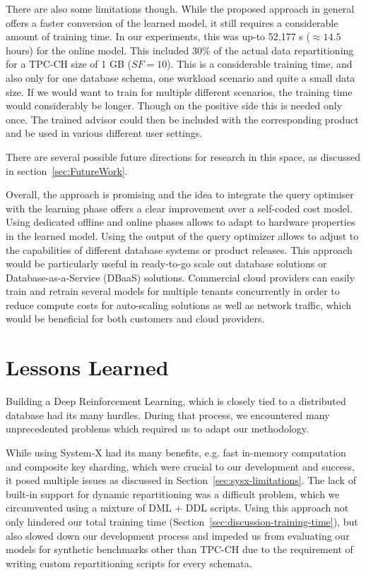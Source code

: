 There are also some limitations though. While the proposed approach in general offers a faster conversion of the learned model, it still requires a considerable amount of training time.
In our experiments, this was up-to 52,177 s ($\approx 14.5$ hours) for the online model. This included 30\% of the actual data repartitioning for a TPC-CH size of 1 GB ($SF = 10$). This is a considerable training time, and also only for one database schema, one workload scenario and quite a small data size. If we would want to train for multiple different scenarios, the training time would considerably be longer. Though on the positive side this is needed only once. The trained advisor could then be included with the corresponding product and be used in various different user settings.

There are several possible future directions for research in this space, as discussed in section~\ref{sec:FutureWork}.

Overall, the approach is promising and the idea to integrate the query optimiser with the learning phase offers a clear improvement over a self-coded cost model. 
Using dedicated offline and online phases allows to adapt to hardware properties in the learned model. Using the output of the query optimizer allows to adjust to the capabilities of different database systems or product releases. This approach would be particularly useful in ready-to-go scale out database solutions or Database-as-a-Service (DBaaS) solutions. Commercial cloud providers can easily train and retrain several models for multiple tenants concurrently in order to reduce compute costs for auto-scaling solutions as well as network traffic, which would be beneficial for both customers and cloud providers.

\section{Lessons Learned}
Building a Deep Reinforcement Learning, which is closely tied to a distributed database had its many hurdles. During that process, we encountered many unprecedented problems which required us to adapt our methodology. 

While using System-X had its many benefits, e.g. fast in-memory computation and composite key sharding, which were crucial to our development and success, it posed multiple issues as discussed in Section~\ref{sec:sysx-limitations}. The lack of built-in support for dynamic repartitioning was a difficult problem, which we circumvented using a mixture of DML + DDL scripts. Using this approach not only hindered our total training time (Section~\ref{sec:discussion-training-time}), but also slowed down our development process and impeded us from evaluating our models for synthetic benchmarks other than TPC-CH due to the requirement of writing custom repartitioning scripts for every schemata. 

